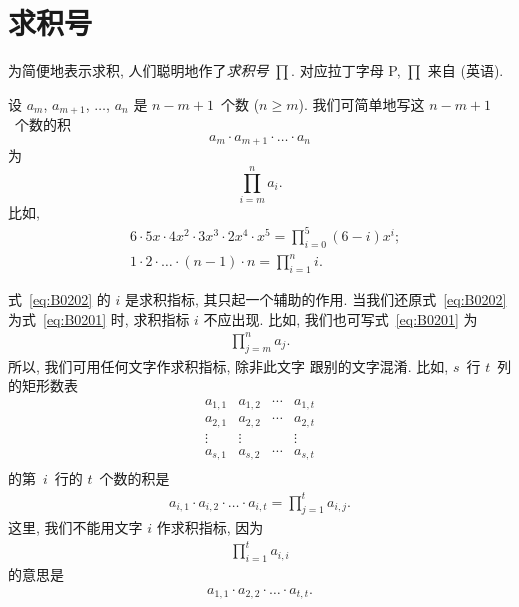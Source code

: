 \documentclass[../libro.tex]{subfiles}
\begin{document}
\section{求积号}

为简便地表示求积,
人们聪明地作了\emph{求积号} \(\prod\).
对应拉丁字母 P, \(\prod\) 来自  (英语).

设 \(a_m\), \(a_{m+1}\), \(\dots\), \(a_n\) 是
\(n - m + 1\)~个数 (\(n \geq m\)).
我们可简单地写这 \(n - m + 1\)~个数的积
\begin{equation}
    a_m \cdot a_{m+1} \cdot \dots \cdot a_n
    \label{eq:B0201}
\end{equation}
为
\begin{equation}
    \prod_{i = m}^{n} {a_i}.
    \label{eq:B0202}
\end{equation}
比如,
\begin{align*}
    & 6 \cdot 5x \cdot 4x^2 \cdot 3x^3 \cdot 2x^4 \cdot x^5
    = \prod_{i = 0}^{5} {(6 - i)x^i};                        \\
    & 1 \cdot 2 \cdot \dots \cdot (n - 1) \cdot n
    = \prod_{i = 1}^{n} {i}.
\end{align*}

式~\eqref{eq:B0202} 的 \(i\) 是求积指标,
其只起一个辅助的作用.
当我们还原式~\eqref{eq:B0202}
为式~\eqref{eq:B0201} 时,
求积指标 \(i\) 不应出现.
比如, 我们也可写式~\eqref{eq:B0201} 为
\begin{align*}
    \prod_{j = m}^{n} {a_j}.
\end{align*}
所以, 我们可用任何文字作求积指标, 除非此文字%
跟别的文字混淆.
比如, \(s\)~行 \(t\)~列的矩形数表
\begin{equation}
    \begin{matrix}
        a_{1,1} & a_{1,2} & \cdots & a_{1,t} \\
        a_{2,1} & a_{2,2} & \cdots & a_{2,t} \\
        \vdots  & \vdots  & {}     & \vdots  \\
        a_{s,1} & a_{s,2} & \cdots & a_{s,t} \\
    \end{matrix}
    \label{eq:B0203}
\end{equation}
的第~\(i\)~行的 \(t\)~个数的积是
\begin{align*}
    a_{i,1} \cdot a_{i,2} \cdot \dots \cdot a_{i,t}
    = \prod_{j = 1}^{t} {a_{i,j}}.
\end{align*}
这里, 我们不能用文字 \(i\) 作求积指标,
因为
\begin{align*}
    \prod_{i = 1}^{t} {a_{i,i}}
\end{align*}
的意思是
\begin{align*}
    a_{1,1} \cdot a_{2,2} \cdot \dots \cdot a_{t,t}.
\end{align*}
\end{document}
